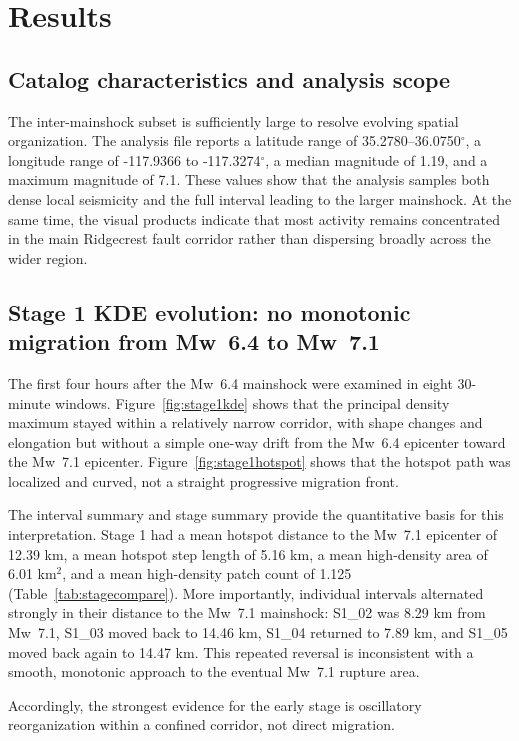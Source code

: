 \documentclass[11pt]{article}
\begin{document}
\section{Results}
\subsection{Catalog characteristics and analysis scope}
The inter-mainshock subset is sufficiently large to resolve evolving spatial organization. The analysis file reports a latitude range of 35.2780--36.0750$^{\circ}$, a longitude range of -117.9366 to -117.3274$^{\circ}$, a median magnitude of 1.19, and a maximum magnitude of 7.1. These values show that the analysis samples both dense local seismicity and the full interval leading to the larger mainshock. At the same time, the visual products indicate that most activity remains concentrated in the main Ridgecrest fault corridor rather than dispersing broadly across the wider region.

\subsection{Stage 1 KDE evolution: no monotonic migration from Mw~6.4 to Mw~7.1}
The first four hours after the Mw~6.4 mainshock were examined in eight 30-minute windows. Figure~\ref{fig:stage1kde} shows that the principal density maximum stayed within a relatively narrow corridor, with shape changes and elongation but without a simple one-way drift from the Mw~6.4 epicenter toward the Mw~7.1 epicenter. Figure~\ref{fig:stage1hotspot} shows that the hotspot path was localized and curved, not a straight progressive migration front.

The interval summary and stage summary provide the quantitative basis for this interpretation. Stage 1 had a mean hotspot distance to the Mw~7.1 epicenter of 12.39 km, a mean hotspot step length of 5.16 km, a mean high-density area of 6.01 km$^2$, and a mean high-density patch count of 1.125 (Table~\ref{tab:stagecompare}). More importantly, individual intervals alternated strongly in their distance to the Mw~7.1 mainshock: S1\_02 was 8.29 km from Mw~7.1, S1\_03 moved back to 14.46 km, S1\_04 returned to 7.89 km, and S1\_05 moved back again to 14.47 km. This repeated reversal is inconsistent with a smooth, monotonic approach to the eventual Mw~7.1 rupture area.

Accordingly, the strongest evidence for the early stage is oscillatory reorganization within a confined corridor, not direct migration.
\end{document}
